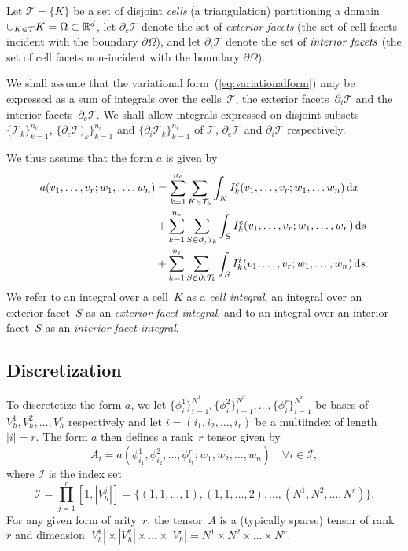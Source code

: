 Let $\mathcal{T} = \{K\}$ be a set of disjoint \emph{cells} (a
triangulation) partitioning a domain $\cup_{K\in\mathcal{T}} K =
\Omega \subset \mathbb{R}^d$, let $\partial_e \mathcal{T}$ denote the set of
\emph{exterior facets} (the set of cell facets
incident with the boundary $\partial \Omega$), and let $\partial_i
\mathcal{T}$ denote the set of $\emph{interior facets}$ (the set of
cell facets non-incident with the boundary $\partial \Omega$).

We shall assume that the variational form~(\ref{eq:variationalform}) may
be expressed as a sum of integrals over the cells~$\mathcal{T}$, the
exterior facets~$\partial_i \mathcal{T}$ and the interior
facets~$\partial_e \mathcal{T}$. We shall allow integrals expressed on
disjoint subsets $\{\mathcal{T}_k\}_{k=1}^{n_c}$, $\{\partial_e
\mathcal{T})_k\}_{k=1}^{n_e}$ and $\{\partial_i \mathcal{T}_k\}_{k=1}^{n_i}$ of $\mathcal{T}$, $\partial_e \mathcal{T}$ and
$\partial_i \mathcal{T}$ respectively.

We thus assume that the form $a$ is given by
\begin{equation}
  \begin{split}
    a(v_1, \ldots, v_r; w_1, \ldots,  w_n)
    &=
    \sum_{k=1}^{n_c} \sum_{K\in\mathcal{T}_k} \int_{K}
    I^c_k(v_1, \ldots, v_r; w_1, \ldots w_n) \, \mathrm{d}x \\
    &+
    \sum_{k=1}^{n_e} \sum_{S\in\partial_e\mathcal{T}_k} \int_{S}
    I^e_k(v_1, \ldots, v_r; w_1, \ldots,  w_n) \, \mathrm{d}s \\
    &+
    \sum_{k=1}^{n_i} \sum_{S\in\partial_i\mathcal{T}_k} \int_{S}
    I^i_k(v_1, \ldots, v_r; w_1, \ldots, w_n) \, \mathrm{d}s.
  \end{split} \label{eq:form_integrals}
\end{equation}
We refer to an integral over a cell~$K$ as a \emph{cell integral},
an integral over an exterior facet~$S$ as an \emph{exterior facet integral},
and to an integral over an interior facet~$S$ as an \emph{interior facet integral}.

\subsection{Discretization}
\label{sec:Discretization}

To discretetize the form $a$, we let
$\{\phi_i^1\}_{i=1}^{N^1},
 \{\phi_i^2\}_{i=1}^{N^2}, \ldots,
 \{\phi_i^r\}_{i=1}^{N^r}$
be bases of $V_h^1, V_h^2, \ldots, V_h^r$ respectively and let $i =
(i_1, i_2, \ldots, i_r)$ be a multiindex of length $|i| = r$. The
form $a$ then defines a rank~$r$ tensor given by
\begin{equation} \label{eq:tensor}
  A_i = a(\phi_{i_1}^1, \phi_{i_2}^2, \ldots, \phi_{i_r}^r; w_1, w_2, \ldots, w_n)
  \quad \forall i \in \mathcal{I},
\end{equation}
where $\mathcal{I}$ is the index set
\begin{equation}
  \mathcal{I} = 
  \prod_{j=1}^r[1,|V^j_h|] = \{(1,1,\ldots,1), (1,1,\ldots,2), \ldots,
  (N^1,N^2,\ldots,N^r)\}.
\end{equation}
For any given form of arity~$r$, the tensor~$A$ is a
(typically sparse) tensor of rank~$r$ and dimension
$|V_h^1| \times |V_h^2| \times \ldots \times |V_h^r|
= N^1 \times N^2 \times \ldots \times N^r$.

